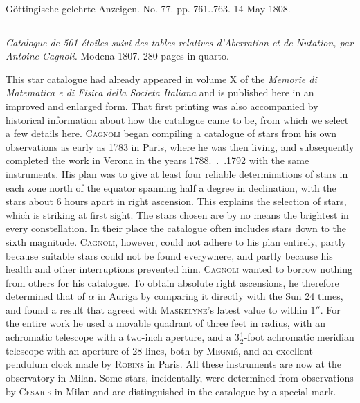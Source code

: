 \clearpage
{}
\hypertarget{native-501-lower}{}\label{native-501-lower}
\begin{center}
\small Göttingische gelehrte Anzeigen. No. 77. pp. 761..763. 14 May 1808.\\[3pt]
\rule{.72\linewidth}{.3pt}
\end{center}

\emph{Catalogue de \textup{501} étoiles suivi des tables relatives d'Aberration et de Nutation, par Antoine Cagnoli.} Modena 1807. 280 pages in quarto.

This star catalogue had already appeared in volume X of the \emph{Memorie di Matematica e di Fisica della Societa Italiana} and is published here in an improved and enlarged form. That first printing was also accompanied by historical information about how the catalogue came to be, from which we select a few details here. \textsc{Cagnoli} began compiling a catalogue of stars from his own observations as early as 1783 in Paris, where he was then living, and subsequently completed the work in Verona in the years 1788\mbox{. . .}1792 with the same instruments. His plan was to give at least four reliable determinations of stars in each zone north of the equator spanning half a degree in declination, with the stars about 6 hours apart in right ascension. This explains the selection of stars, which is striking at first sight. The stars chosen are by no means the brightest in every constellation. In their place the catalogue often includes stars down to the sixth magnitude. \textsc{Cagnoli}, however, could not adhere to his plan entirely, partly because suitable stars could not be found everywhere, and partly because his health and other interruptions prevented him. \textsc{Cagnoli} wanted to borrow nothing from others for his catalogue. To obtain absolute right ascensions, he therefore determined that of $\alpha$ in Auriga by comparing it directly with the Sun 24 times, and found a result that agreed with \textsc{Maskelyne}’s latest value to within $1''$. For the entire work he used a movable quadrant of three feet in radius, with an achromatic telescope with a two-inch aperture, and a 3$\frac{1}{2}$-foot achromatic meridian telescope with an aperture of 28 lines, both by \textsc{Megnié}, and an excellent pendulum clock made by \textsc{Robins} in Paris.
All these instruments are now at the observatory in Milan. Some stars, incidentally, were determined from observations by \textsc{Cesaris} in Milan and are distinguished in the catalogue by a special mark.


